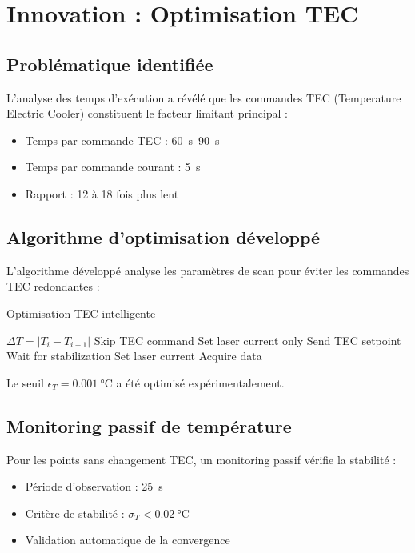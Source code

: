 \section{Innovation : Optimisation TEC}

\subsection{Problématique identifiée}

L'analyse des temps d'exécution a révélé que les commandes TEC (Temperature Electric Cooler) constituent le facteur limitant principal :
\begin{itemize}
    \item Temps par commande TEC : \SIrange{60}{90}{\second}
    \item Temps par commande courant : \SI{5}{\second}
    \item Rapport : 12 à 18 fois plus lent
\end{itemize}

\subsection{Algorithme d'optimisation développé}

L'algorithme développé analyse les paramètres de scan pour éviter les commandes TEC redondantes :

\begin{algorithm}[ht]
\caption{Optimisation TEC intelligente}
\begin{algorithmic}[1]
    \State $\Delta T = |T_i - T_{i-1}|$
        \State Skip TEC command
        \State Set laser current only
    \Else
        \State Send TEC setpoint
        \State Wait for stabilization
        \State Set laser current
    \EndIf
    \State Acquire data
\EndFor
\end{algorithmic}
\end{algorithm}

Le seuil $\epsilon_T = \SI{0.001}{\celsius}$ a été optimisé expérimentalement.

\subsection{Monitoring passif de température}

Pour les points sans changement TEC, un monitoring passif vérifie la stabilité :

\begin{itemize}
    \item Période d'observation : \SI{25}{\second}
    \item Critère de stabilité : $\sigma_T < \SI{0.02}{\celsius}$
    \item Validation automatique de la convergence
\end{itemize}

